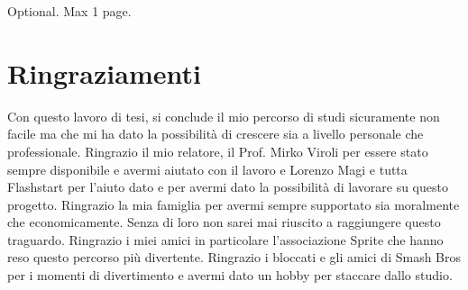 \documentclass[12pt,a4paper,openright,twoside]{book}
\begin{document}
% 




\backmatter



\begin{acknowledgements} %
 Optional. Max 1 page.
\end{acknowledgements}

\chapter*{Ringraziamenti}
Con questo lavoro di tesi, si conclude il mio percorso di studi
sicuramente non facile ma che mi ha dato la possibilità di crescere sia
a livello personale che professionale.  \hfill \break
Ringrazio il mio relatore, il Prof. Mirko Viroli per essere stato sempre disponibile e avermi aiutato con il lavoro
e Lorenzo Magi e tutta Flashstart per l'aiuto dato e per avermi dato la possibilità di lavorare su questo progetto.  \hfill \break
Ringrazio la mia famiglia per avermi sempre supportato sia moralmente che economicamente. Senza
di loro non sarei mai riuscito a raggiungere questo traguardo.  \hfill \break
Ringrazio i miei amici in particolare l'associazione Sprite che hanno
reso questo percorso più divertente.
Ringrazio i bloccati e gli amici di Smash Bros per i momenti di divertimento e avermi dato un hobby per
staccare dallo studio.
\end{document}
